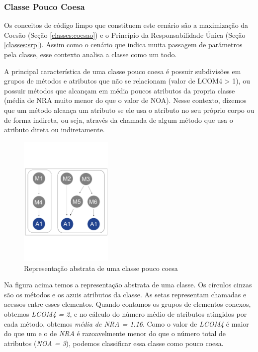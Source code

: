                                       
                      

\subsubsection{Classe Pouco Coesa}
    
Os conceitos de código limpo que constituem este cenário são a maximização da Coesão (Seção \ref{classes:coesao}) e o Princípio da Responsabilidade Única (Seção \ref{classes:srp}). Assim como o cenário que indica muita passagem de parâmetros pela classe, esse contexto analisa a classe como um todo.
	
A principal característica de uma classe pouco coesa é possuir subdivisões em grupos de métodos e atributos que não se relacionam (valor de LCOM4 > 1), ou possuir métodos que alcançam em média poucos atributos da propria classe (média de NRA muito menor do que o valor de NOA). Nesse contexto, dizemos que um método alcança um atributo se ele usa o atributo no seu próprio corpo ou de forma indireta, ou seja, através da chamada de algum método que usa o atributo direta ou indiretamente.


\begin{figure}[htb]
	\centering
	\includegraphics[trim = 0mm 50mm 0mm 60mm, clip, width=0.4\textwidth]{codigos/exemplos_para_os_cenarios/classe_pouco_coesa.png}
	\caption{Representação abstrata de uma classe pouco coesa}
	\label{classe_pouco_coesa}
\end{figure}
   
    
Na figura acima temos a representação abstrata de uma classe. Os círculos cinzas são os métodos e os azuis atributos da classe. As setas representam chamadas e acessos entre esses elementos. Quando contamos os grupos de elementos conexos, obtemos \textit{LCOM4 = 2}, e no cálculo do número médio de atributos atingidos por cada método, obtemos \textit{média de NRA = 1.16}. Como o valor de \textit{LCOM4} é maior do que um e o de \textit{NRA} é razoavelmente menor do que o número total de atributos (\textit{NOA = 3}), podemos classificar essa classe como pouco coesa.                  
    
